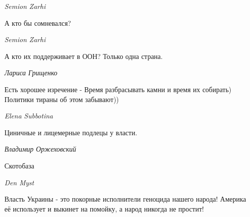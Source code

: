 \emph{Semion Zarhi}

А кто бы сомневался?

\emph{Semion Zarhi}

А кто их поддерживает в ООН? Только одна страна.

\emph{Лариса Грищенко}

Есть хорошее изречение - Время разбрасывать камни и время их собирать) Политики тираны об этом забывают))

\emph{Elena Subbotina}

Циничные и лицемерные подлецы у власти. 🙁

\emph{Владимир Оржеховский}

Скотобаза

\emph{Den Myst}

Власть Украины - это покорные исполнители геноцида нашего народа! Америка её
использует и выкинет на помойку, а народ никогда не простит!
